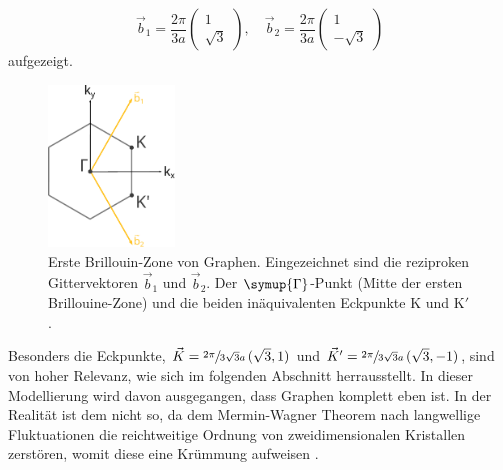 \begin{equation*}
    \vec{b}_1 = \frac{2\pi}{3a} \begin{pmatrix}  1\\[4pt]   \sqrt{3}  \end{pmatrix}, \quad
    \vec{b}_2 = \frac{2\pi}{3a} \begin{pmatrix}  1\\[4pt] - \sqrt{3} \end{pmatrix}       
\end{equation*}    
aufgezeigt.
\begin{figure}
    \centering
    \includegraphics[width = 0.3\textwidth]{Plots/graphene_first_brillouine_zone.pdf}
    \caption{Erste Brillouin-Zone von Graphen.
    Eingezeichnet sind die reziproken Gittervektoren $\vec{b}_1$ und $\vec{b}_2$.
    Der $\symup{\Gamma}$-Punkt (Mitte der ersten Brillouine-Zone) und die beiden inäquivalenten
    Eckpunkte K und K$'$.}
    \label{fig:first-brillouine-zone}
\end{figure}
Besonders die Eckpunkte, $\vec{K} = \sfrac{2\pi}{3\sqrt{3}a} \, (\sqrt{3},1)$ %
und $\vec{K}' = \sfrac{2\pi}{3\sqrt{3}a} \, (\sqrt{3},-1)$, sind von hoher Relevanz, wie sich im folgenden Abschnitt herrausstellt.
In dieser Modellierung wird davon ausgegangen, dass Graphen komplett eben ist. 
In der Realität ist dem nicht so, da dem Mermin-Wagner Theorem nach langwellige Fluktuationen die reichtweitige Ordnung von zweidimensionalen Kristallen zerstören, womit
diese eine Krümmung aufweisen \cite{Fasolino2007}.
\FloatBarrier
\newpage
